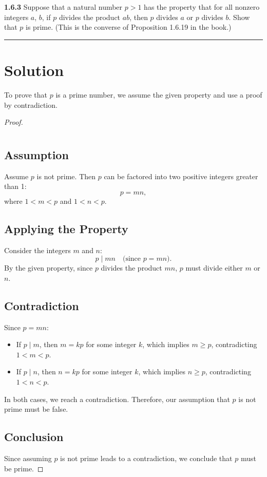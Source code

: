 \documentclass[12pt]{amsart}
\theoremstyle{definition}
\numberwithin{equation}{section}
\begin{document}
\newpage
\begin{exercise}{\textbf{1.6.3}} Suppose that a natural number \(p > 1\) has the property that for all nonzero integers $a$, $b$, if $p$ divides the product \(ab\), then $p$ divides $a$ or $p$ divides $b$. Show that $p$ is prime. (This is the converse of Proposition 1.6.19 in the book.)
    
    \noindent\rule{\linewidth}{1pt}

    \section*{Solution}

To prove that \(p\) is a prime number, we assume the given property and use a proof by contradiction.

\begin{proof}\(\)
    \section*{}\vspace*{-20pt}
\subsection*{Assumption}
Assume \(p\) is not prime. Then \(p\) can be factored into two positive integers greater than 1:
\[
p = mn,
\]
where \(1 < m < p\) and \(1 < n < p\).

\subsection*{Applying the Property}
Consider the integers \(m\) and \(n\):
\[
p \mid mn \quad \text{(since } p = mn\text{)}.
\]
By the given property, since \(p\) divides the product \(mn\), \(p\) must divide either \(m\) or \(n\).

\subsection*{Contradiction}
Since \(p = mn\):
\begin{itemize}[label=--]
    \item If \(p \mid m\), then \(m = kp\) for some integer \(k\), which implies \(m \geq p\), contradicting \(1 < m < p\).
    \item If \(p \mid n\), then \(n = kp\) for some integer \(k\), which implies \(n \geq p\), contradicting \(1 < n < p\).
\end{itemize}

In both cases, we reach a contradiction. Therefore, our assumption that \(p\) is not prime must be false.

\subsection*{Conclusion}
Since assuming \(p\) is not prime leads to a contradiction, we conclude that \(p\) must be prime.

\end{proof}
\end{exercise}
\end{document}
